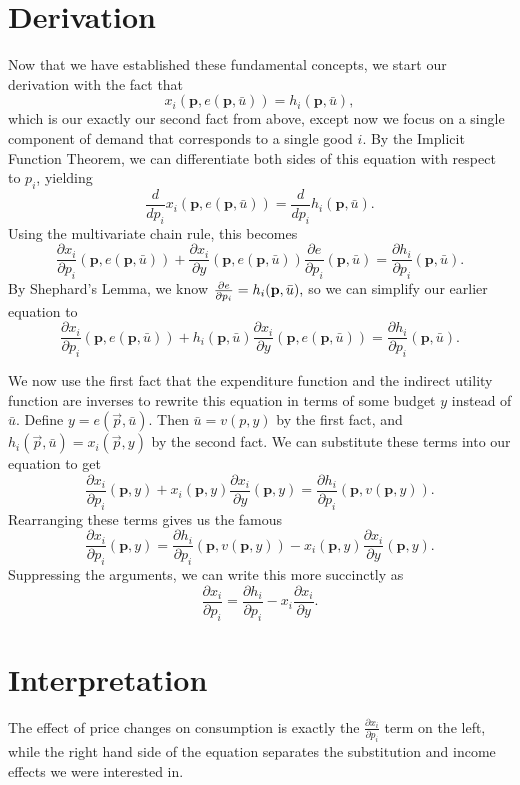 \section{Derivation}

Now that we have established these fundamental concepts, we start our derivation with the fact that 
$$x_{i}(\mathbf{p}, e(\mathbf{p}, \bar{u}))=h_{i}(\mathbf{p}, \bar{u}),$$
which is our exactly our second fact from above, except now we focus on a single component of demand that corresponds to a single good $i$. By the Implicit Function Theorem, we can differentiate both sides of this equation with respect to $p_i$, yielding 
$$\frac{d}{d p_{i}} x_{i}(\mathbf{p}, e(\mathbf{p}, \bar{u}))=\frac{d}{d p_{i}} h_{i}(\mathbf{p}, \bar{u}).$$
Using the multivariate chain rule, this becomes 
$$\frac{\partial x_{i}}{\partial p_{i}}(\mathbf{p}, e(\mathbf{p}, \bar{u}))+\frac{\partial x_{i}}{\partial y}(\mathbf{p}, e(\mathbf{p}, \bar{u})) \frac{\partial e}{\partial p_{i}}(\mathbf{p}, \bar{u})=\frac{\partial h_{i}}{\partial p_{i}}(\mathbf{p}, \bar{u}).$$
By Shephard's Lemma, we know $\pdv{e}{p_i}(\mathbf{p}, \bar{u})=h_{i}(\mathbf{p}, \bar{u}),$ so we can simplify our earlier equation to 
$$\frac{\partial x_{i}}{\partial p_{i}}(\mathbf{p}, e(\mathbf{p}, \bar{u}))+h_{i}(\mathbf{p}, \bar{u}) \frac{\partial x_{i}}{\partial y}(\mathbf{p}, e(\mathbf{p}, \bar{u}))=\frac{\partial h_{i}}{\partial p_{i}}(\mathbf{p}, \bar{u}).$$

We now use the first fact that the expenditure function and the indirect utility function are inverses to rewrite this equation in terms of some budget $y$ instead of $\bar{u}$. Define $y = e(\vec{p}, \bar{u})$. Then $\bar{u} = v(p, y)$ by the first fact, and $h_i(\vec{p}, \bar{u}) = x_i(\vec{p}, y)$ by the second fact. We can substitute these terms into our equation to get 
$$\frac{\partial x_{i}}{\partial p_{i}}(\mathbf{p}, y)+x_{i}(\mathbf{p}, y) \frac{\partial x_{i}}{\partial y}(\mathbf{p}, y)=\frac{\partial h_{i}}{\partial p_{i}}(\mathbf{p}, v(\mathbf{p}, y)).$$
Rearranging these terms gives us the famous 
$$
\boxed{\frac{\partial x_{i}}{\partial p_{i}}(\mathbf{p}, y)=\frac{\partial h_{i}}{\partial p_{i}}(\mathbf{p}, v(\mathbf{p}, y))-x_{i}(\mathbf{p}, y) \frac{\partial x_{i}}{\partial y}(\mathbf{p}, y).}
$$
Suppressing the arguments, we can write this more succinctly as 
$$\frac{\partial x_{i}}{\partial p_{i}}=\frac{\partial h_{i}}{\partial p_{i}}-x_{i} \frac{\partial x_{i}}{\partial y}.$$

\section{Interpretation}
The effect of price changes on consumption is exactly the $\frac{\partial x_{i}}{\partial p_{i}}$ term on the left, while the right hand side of the equation separates the substitution and income effects we were interested in. 

